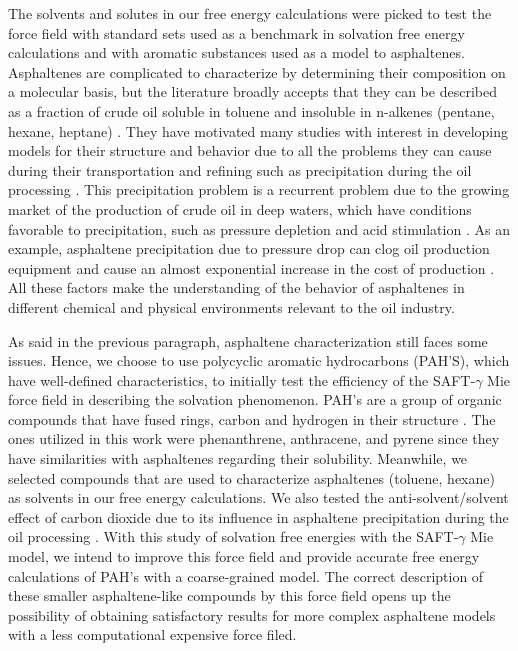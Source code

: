 The solvents and solutes in our free energy calculations were picked to test the force field with standard sets used as a benchmark in solvation free energy calculations and with aromatic substances used as a model to asphaltenes. Asphaltenes are complicated to characterize by determining their composition on a molecular basis, but the literature broadly accepts that they can be described as a fraction of crude oil soluble in toluene and insoluble in n-alkenes (pentane, hexane, heptane) \cite{SJOBLOM2003399}. They have motivated many studies with interest in developing models for their structure and behavior due to all the problems they can cause during their transportation and refining such as precipitation during the oil processing \cite{SJOBLOM20151}. This precipitation problem is a recurrent problem due to the growing market of the production of crude oil in deep waters, which have conditions favorable to precipitation, such as pressure depletion and acid stimulation \cite{AIC:AIC10243}. As an example, asphaltene precipitation due to pressure drop can clog oil production equipment and cause an almost exponential increase in the cost of production \cite{AIC:AIC10243,doi:10.1021/ef010047l}. All these factors make the understanding of the behavior of asphaltenes in different chemical and physical environments relevant to the oil industry. 

As said in the previous paragraph, asphaltene characterization still faces some issues. Hence, we choose to use polycyclic aromatic hydrocarbons (PAH'S), which have well-defined characteristics, to initially test the efficiency of the SAFT-$\gamma$ Mie force field in describing the solvation phenomenon. PAH's are a group of organic compounds that have fused rings, carbon and hydrogen in their structure \cite{RAVINDRA20082895}. The ones utilized in this work were phenanthrene, anthracene, and pyrene since they have similarities with asphaltenes regarding their solubility. Meanwhile,  we selected compounds that are used to characterize asphaltenes (toluene, hexane) as solvents in our free energy calculations. We also tested the anti-solvent/solvent effect of carbon dioxide due to its influence in asphaltene precipitation during the oil processing \cite{SOROUSH2014405}. With this study of solvation free energies with the SAFT-$\gamma$ Mie model, we intend to improve this force field and provide accurate free energy calculations of PAH's with a coarse-grained model. The correct description of these smaller asphaltene-like compounds by this force field opens up the possibility of obtaining satisfactory results for more complex asphaltene models with a less computational expensive force filed.

